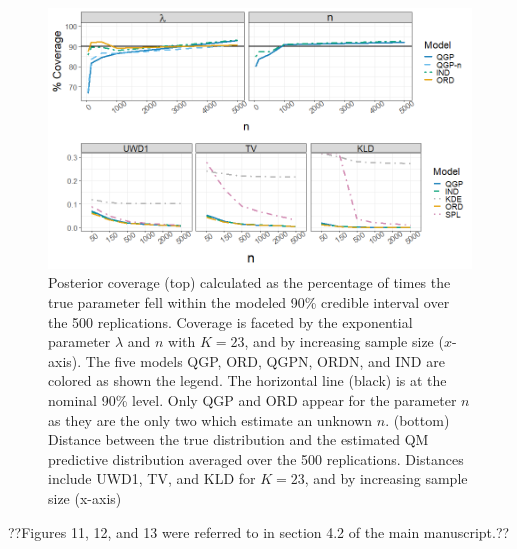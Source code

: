 \documentclass[preprint,12pt,authoryear]{elsarticle}
\begin{document}
\begin{figure}[hbt!]
  \includegraphics[width=\linewidth]{Images/exp_cov_dists.png}

\caption{ Posterior coverage (top) calculated as the percentage of times the 
true parameter fell within the
modeled 90\% credible interval over the 500 replications. Coverage is faceted 
by the exponential parameter $\lambda$
and $n$ with $K = 23$, and by increasing sample size ($x$-axis). 
The five models 
QGP, ORD, QGPN, ORDN,
and IND are colored as shown the legend. The horizontal line (black) is at 
the nominal 90\% level. Only QGP
and ORD appear for the parameter $n$ as they are the only two which estimate 
an unknown $n$. (bottom)
Distance between the true distribution and the estimated QM predictive 
distribution averaged over the 500
replications. Distances include UWD1, TV, and KLD for $K = 23$, 
and by increasing sample size (x-axis)}
\label{fig:exp_cov_dists}
\end{figure}



??Figures 11, 12, and 13 were referred to
in section 4.2 of the main manuscript.??
\end{document}
